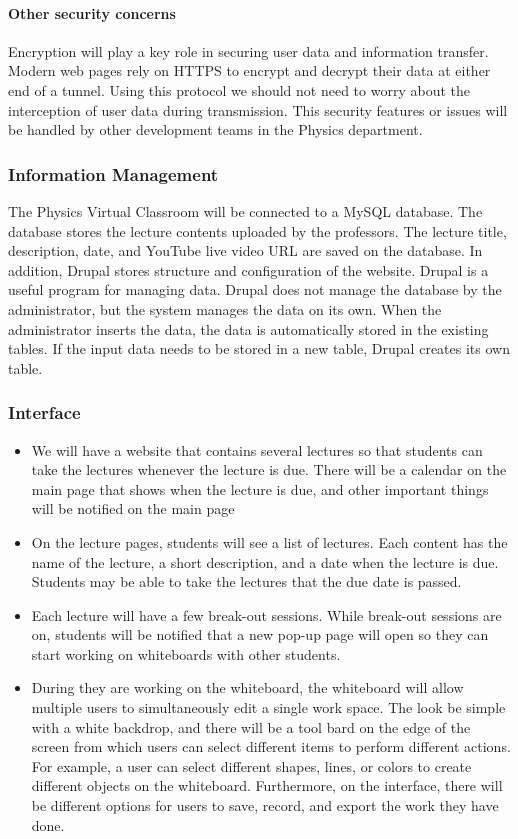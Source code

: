 \documentclass[10pt]{article}
\begin{document}
            \paragraph{Other security concerns}
                Encryption will play a key role in securing user data and information transfer. Modern web pages rely on HTTPS to encrypt and decrypt their data at either end of a tunnel. Using this protocol we should not need to worry about the interception of user data during transmission. This security features or issues will be handled by other development teams in the Physics department.

        \subsubsection{Information Management}
            The Physics Virtual Classroom will be connected to a MySQL database. The database stores the lecture contents uploaded by the professors. The lecture title, description, date, and YouTube live video URL are saved on the database. In addition, Drupal stores structure and configuration of the website. Drupal is a useful program for managing data. Drupal does not manage the database by the administrator, but the system manages the data on its own. When the administrator inserts the data, the data is automatically stored in the existing tables. If the input data needs to be stored in a new table, Drupal creates its own table.

        \subsubsection{Interface}
            \begin{itemize}
                \item We will have a website that contains several lectures so that students can take the lectures whenever the lecture is due. There will be a calendar on the main page that shows when the lecture is due, and other important things will be notified on the main page
                \item On the lecture pages, students will see a list of lectures. Each content has the name of the lecture, a short description, and a date when the lecture is due. Students may be able to take the lectures that the due date is passed.
                \item Each lecture will have a few break-out sessions. While break-out sessions are on, students will be notified that a new pop-up page will open so they can start working on whiteboards with other students.
                \item During they are working on the whiteboard, the whiteboard will allow multiple users to simultaneously edit a single work space. The look be simple with a white backdrop, and there will be a tool bard on the edge of the screen from which users can select different items to perform different actions. For example, a user can select different shapes, lines, or colors to create different objects on the whiteboard. Furthermore, on the interface, there will be different options for users to save, record, and export the work they have done.
            \end{itemize}
   \newpage
\end{document}
